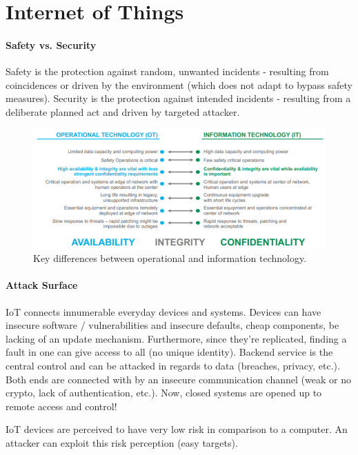 \section{Internet of Things}

\paragraph{Safety vs. Security}
Safety is the protection against random, unwanted incidents - resulting from coincidences or driven by the environment (which does not adapt to bypass safety measures). Security is the protection against intended incidents - resulting from a deliberate planned act and driven by targeted attacker.


\begin{figure}[h]
	\centering
	\includegraphics[scale=0.8]{images/913-otvsit.PNG}
	\caption{Key differences between operational and information technology.}
	\label{fig:ot}
\end{figure}

\paragraph{Attack Surface}
IoT connects innumerable everyday devices and systems. Devices can have insecure software / vulnerabilities and insecure defaults, cheap components, be lacking of an update mechanism. Furthermore, since they're replicated, finding a fault in one can give access to all (no unique identity). Backend service is the central control and can be attacked in regards to data (breaches, privacy, etc.). Both ends are connected with by an insecure communication channel (weak or no crypto, lack of authentication, etc.). Now, closed systems are opened up to remote access and control!

IoT devices are perceived to have very low risk in comparison to a computer. An attacker can exploit this risk perception (easy targets).


